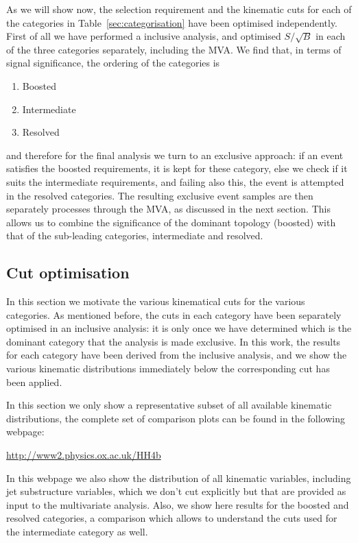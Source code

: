 As we will show now, the selection requirement and the kinematic cuts
for each of the categories in Table~\ref{sec:categorisation} have
been optimised independently.
%
First of all we have performed a inclusive analysis, and optimised
$S/\sqrt{B}$ in each of the three categories separately, including
the MVA.
%
We find that, in terms of signal significance, the ordering of
the categories is
\begin{enumerate}
\item Boosted 
\item Intermediate
  \item Resolved
  \end{enumerate}
and therefore for the final analysis we turn to an exclusive approach:
if an event satisfies the boosted requirements, it is kept for
these category, else we check if it suits the intermediate
requirements, and failing also this, the event is attempted
in the resolved categories.
%
The resulting exclusive event samples are then separately processes
through the MVA, as discussed in the next section.
%
This allows us to combine the significance of the dominant topology
(boosted) with that of the sub-leading categories, intermediate
and resolved.

\subsection{Cut optimisation}

In this section we motivate the various
kinematical cuts for the various categories.
%
As mentioned before, the cuts in each category have been separately
optimised in an inclusive analysis: it is only once we have determined
which is the dominant category that the analysis is made exclusive.
%
In this work, the results for each category have been derived
from the inclusive analysis,
and we show the various kinematic distributions immediately
below the corresponding cut has been applied.

In this section we only show a representative subset of
all available kinematic distributions, the complete
set of comparison plots can be found in the following
webpage:
\begin{center}
\url{http://www2.physics.ox.ac.uk/HH4b}
  \end{center}
In this webpage we also show the distribution of all
kinematic variables, including jet substructure variables,
which we don't cut explicitly but that are provided as
input to the multivariate analysis.
%
Also, we show here results for the boosted and resolved categories,
a comparison which allows to understand the cuts used for the
intermediate category as well.

